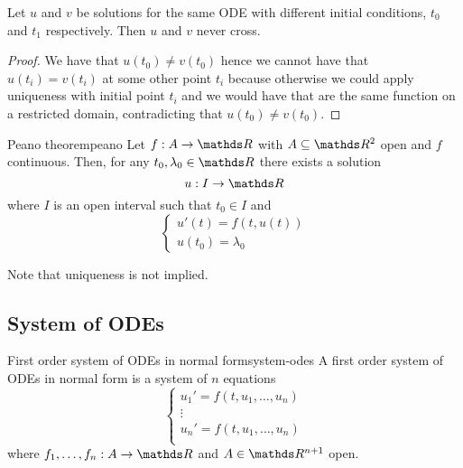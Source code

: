 \documentclass[12pt]{extarticle}
\begin{document}
\begin{corollary}{}{}
	Let $u$ and $v$ be solutions for the same ODE with different initial conditions, $t_0$ and $t_1$ respectively.
	Then $u$ and $v$ never cross.
\end{corollary}

\begin{proof}
	We have that $u(t_0) \neq v(t_0)$ hence we cannot have that $u(t_i) = v(t_i)$ at some other point $t_i$ because otherwise we could apply uniqueness with initial point $t_i$ and we would have that are the same function on a restricted domain,
	contradicting that $u(t_0) \neq v(t_0)$.
\end{proof}

\begin{theorem}{Peano theorem}{peano}
	Let $f: A \to \R$ with $A \subseteq \R^2$ open and $f$ continuous.
	Then, for any $t_0, \lambda_0 \in \R$ there exists a solution
	\begin{equation}
		u: I \to \R
	\end{equation}
	where $I$ is an open interval such that $t_0 \in I$ and
	\begin{equation}
		\begin{cases}
			u'(t) = f(t, u(t)) \\
			u(t_0) = \lambda_0
		\end{cases}
	\end{equation}

	Note that uniqueness is not implied.
\end{theorem}

\subsection{System of ODEs}

\begin{definition}{First order system of ODEs in normal form}{system-odes}
	A first order system of ODEs in normal form is a system of $n$ equations
	\begin{equation}
		\begin{cases}
			u_1' = f(t, u_1, \dots, u_n) \\
			\vdots                       \\
			u_n' = f(t, u_1, \dots, u_n) \\
		\end{cases}
	\end{equation}
	where $f_1, \dots, f_n: A \to \R$ and $A \in \R^{n+1}$ open.
\end{definition}
\end{document}
